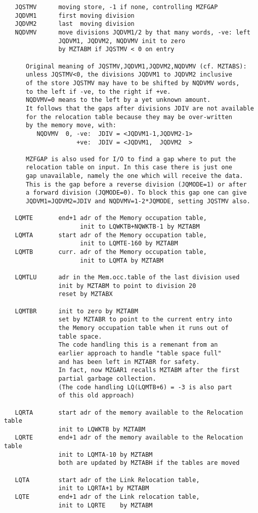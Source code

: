 \begin{verbatim}
   JQSTMV      moving store, -1 if none, controlling MZFGAP
   JQDVM1      first moving division
   JQDVM2      last  moving division
   NQDVMV      move divisions JQDVM1/2 by that many words, -ve: left
               JQDVM1, JQDVM2, NQDVMV init to zero
               by MZTABM if JQSTMV < 0 on entry

      Original meaning of JQSTMV,JQDVM1,JQDVM2,NQDVMV (cf. MZTABS):
      unless JQSTMV<0, the divisions JQDVM1 to JQDVM2 inclusive
      of the store JQSTMV may have to be shifted by NQDVMV words,
      to the left if -ve, to the right if +ve.
      NQDVMV=0 means to the left by a yet unknown amount.
      It follows that the gaps after divisions JDIV are not available
      for the relocation table because they may be over-written
      by the memory move, with:
         NQDVMV  0, -ve:  JDIV = <JQDVM1-1,JQDVM2-1>
                    +ve:  JDIV = <JQDVM1,  JQDVM2  >

      MZFGAP is also used for I/O to find a gap where to put the
      relocation table on input. In this case there is just one
      gap unavailable, namely the one which will receive the data.
      This is the gap before a reverse division (JQMODE=1) or after
      a forward division (JQMODE=0). To block this gap one can give
      JQDVM1=JQDVM2=JDIV and NQDVMV=1-2*JQMODE, setting JQSTMV also.

   LQMTE       end+1 adr of the Memory occupation table,
                     init to LQWKTB+NQWKTB-1 by MZTABM
   LQMTA       start adr of the Memory occupation table,
                     init to LQMTE-160 by MZTABM
   LQMTB       curr. adr of the Memory occupation table,
                     init to LQMTA by MZTABM

   LQMTLU      adr in the Mem.occ.table of the last division used
               init by MZTABM to point to division 20
               reset by MZTABX

   LQMTBR      init to zero by MZTABM
               set by MZTABR to point to the current entry into
               the Memory occupation table when it runs out of
               table space.
               The code handling this is a remenant from an
               earlier approach to handle "table space full"
               and has been left in MZTABR for safety.
               In fact, now MZGAR1 recalls MZTABM after the first
               partial garbage collection.
               (The code handling LQ(LQMTB+6) = -3 is also part
               of this old approach)

   LQRTA       start adr of the memory available to the Relocation table
               init to LQWKTB by MZTABM
   LQRTE       end+1 adr of the memory available to the Relocation table
               init to LQMTA-10 by MZTABM
               both are updated by MZTABH if the tables are moved

   LQTA        start adr of the Link Relocation table,
               init to LQRTA+1 by MZTABM
   LQTE        end+1 adr of the Link relocation table,
               init to LQRTE    by MZTABM

\end{verbatim}

